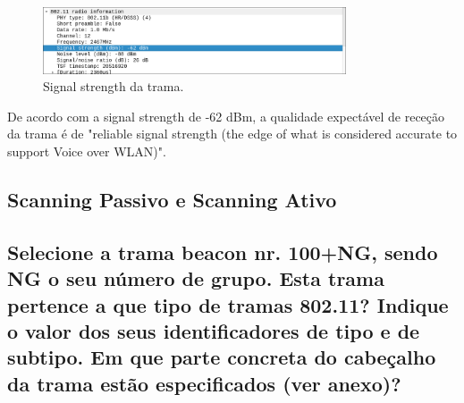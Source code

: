 \documentclass{article}
\begin{document}
\begin{figure}[h]
    \centering
    \includegraphics[width=0.8\textwidth]{signal.png}
    \caption{\label{fig:signal}Signal strength da trama.}
\end{figure}

De acordo com a signal strength de -62 dBm, a qualidade expectável de receção da trama é de "reliable signal strength (the edge of what is considered accurate to support Voice over WLAN)".

\subsection*{Scanning Passivo e Scanning Ativo}
\subsection{Selecione a trama beacon nr. 100+NG, sendo NG o seu número de grupo. Esta  trama pertence a que tipo de tramas 802.11? Indique o valor dos seus  identificadores de tipo e de subtipo. Em que parte concreta do cabeçalho da  trama estão especificados (ver anexo)?}
\end{document}
